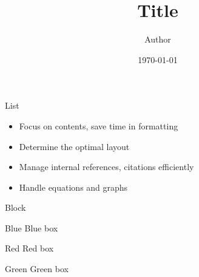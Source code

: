 \documentclass{beamer}
\title{Title}
\author{Author}
\date{\today}
\providecommand{\tightlist}{
\setlength{\itemsep}{0pt}\setlength{\parskip}{0pt}}
\begin{document}
\maketitle

\begin{frame}{List}

{
\begin{itemize}
\tightlist
\item
  Focus on contents, save time in formatting
\item
  Determine the optimal layout
\item
  Manage internal references, citations efficiently
\item
  Handle equations and graphs
\end{itemize}
}

\end{frame}

\begin{frame}{Block}
\begin{block}{Blue}
{
Blue box
}
\end{block}

\begin{alertblock}{Red}
{
Red box
}
\end{alertblock}

\begin{exampleblock}{Green}
{
Green box
}
\end{exampleblock}
\end{frame}
\end{document}
